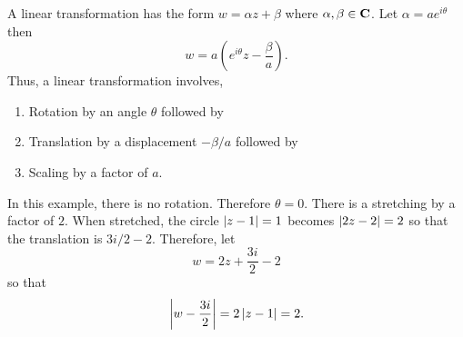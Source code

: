 \begin{enumerate}
A linear transformation has the form $w = \alpha z + \beta$ where $\alpha, \beta
\in \mathbf{C}$. Let $\alpha = ae^{i\theta}$ then
\[
w = a\left(e^{i\theta}z - \frac{\beta}{a}\right).
\]
Thus, a linear transformation involves,
\begin{enumerate}
\item Rotation by an angle $\theta$ followed by
\item Translation by a displacement $-\beta/a$ followed by
\item Scaling by a factor of $a$.
\end{enumerate}
In this example, there is no rotation. Therefore $\theta = 0$. There is a stretching
by a factor of $2$. When stretched, the circle $\left\vert{z - 1}\right\vert = 1$ becomes $\left\vert{2z - 2}\right\vert
= 2$ so that the translation is $3i/2 - 2$. Therefore, let
\[
w = 2z + \frac{3i}{2} - 2
\]
so that
\[
\left\vert{w - \frac{3i}{2}}\right\vert = 2\left\vert{z - 1}\right\vert = 2.
\]
\end{enumerate}
